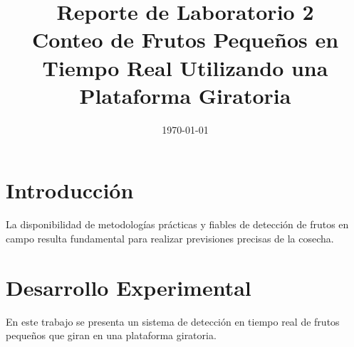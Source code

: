\documentclass[conference]{IEEEtran}
\date{\specialdate\today}
\begin{document}
\newcommand{\breite}{0.9} %
\newcommand{\RelacionFiguradoscolumnas}{0.9}
\newcommand{\RelacionFiguradoscolumnasPuntoCinco}{0.45}

\title{Reporte de Laboratorio 2 \\ Conteo de Frutos Pequeños en Tiempo Real Utilizando una Plataforma Giratoria}

\author{

}

\maketitle

\begin{abstract} 
    
\end{abstract}

\section{Introducción}
La disponibilidad de metodologías prácticas y fiables de detección de frutos en campo resulta fundamental para realizar previsiones precisas de la cosecha\cite{deteccionFrutosGRAP}. 


\section{Desarrollo Experimental}
En este trabajo se presenta un sistema de detección en tiempo real de frutos pequeños que giran en una plataforma giratoria.
\end{document}
